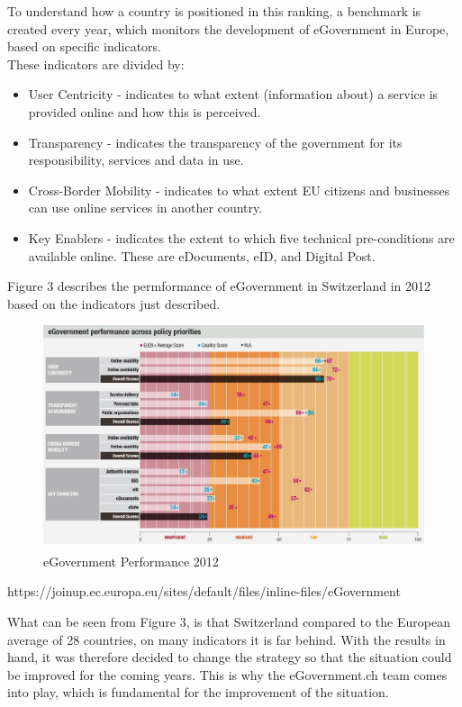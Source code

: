 To understand how a country is positioned in this ranking, a benchmark is created every year, which monitors the development of eGovernment in Europe, based on specific indicators.\\
These indicators are divided by:
\begin{itemize}
\item User Centricity - indicates to what extent (information about) a service is
provided online and how this is perceived.
\item Transparency - indicates the transparency of the government for its responsibility, services and data in use.
\item Cross-Border Mobility - indicates to what extent EU citizens and businesses can use online services in another country.
\item Key Enablers - indicates the extent to which five technical pre-conditions are available online. These are eDocuments, eID, and Digital Post.
\end{itemize}

\newpage
Figure 3 describes the permformance of eGovernment in Switzerland in 2012 based on the indicators just described.
\begin{figure}[!htb]
\centering
\includegraphics[width=1\textwidth]{images/key2012.jpg}
\caption{eGovernment Performance 2012 \cite{eGov2012bench}}
\label{bench2012}
\end{figure}
\FloatBarrier
https://joinup.ec.europa.eu/sites/default/files/inline-files/eGovernment%

What can be seen from Figure 3, is that Switzerland compared to the European average of 28 countries, on many indicators it is far behind.
With the results in hand, it was therefore decided to change the strategy so that the situation could be improved for the coming years.
This is why the eGovernment.ch team comes into play, which is fundamental for the improvement of the situation.

